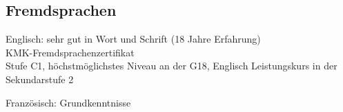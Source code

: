 \documentclass[10pt,letterpaper]{article}
\newenvironment{indentsection}[1]%
{\begin{list}{}%
	{\setlength{\leftmargin}{#1}}%
	\item[]%
}
{\end{list}}
\begin{document}
\subsection*{Fremdsprachen}

\begin{indentsection}{\parindent}
\begin{description*}
  \item[Englisch:] sehr gut in Wort und Schrift (18 Jahre Erfahrung) \\ KMK-Fremdsprachenzertifikat \\ Stufe C1, höchstmöglichstes Niveau an der G18, 	Englisch Leistungskurs in der Sekundarstufe 2
  \item[Französisch:] Grundkenntnisse
\end{description*}
\end{indentsection}
\end{document}
